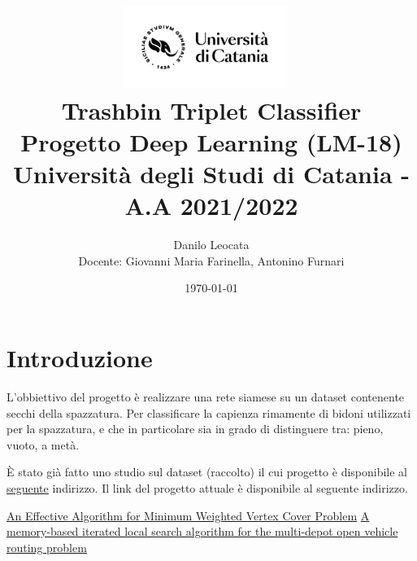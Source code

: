 \documentclass[11pt]{article}
\title{ %
\includegraphics[width=0.4\textwidth]{UniCT-Logo-Nero}~\\
Trashbin Triplet Classifier \\ 
\large Progetto Deep Learning (LM-18) \\ Università degli Studi di Catania - A.A 2021/2022 \\
}
\author{ Danilo Leocata \\ Docente: Giovanni Maria Farinella, Antonino Furnari}
\date{\today}
\begin{document}
\maketitle	
\pagebreak


\section{Introduzione}

L'obbiettivo del progetto è realizzare una rete siamese su un dataset contenente secchi della spazzatura.
Per classificare la capienza rimamente di bidoni utilizzati per la spazzatura, e che in particolare sia in grado di distinguere tra: pieno, vuoto, a metà.

È stato già fatto uno studio sul dataset (raccolto) il cui progetto è disponibile al \href{https://github.com/khalld/trashbin-classifier}{seguente} indirizzo.
Il link del progetto attuale è disponibile al seguente indirizzo.

\pagebreak

\begin{thebibliography}{5}


 \href{https://www.researchgate.net/publication/242463011_An_Effective_Algorithm_for_Minimum_Weighted_Vertex_Cover_problem}{An Effective Algorithm for Minimum Weighted Vertex Cover Problem}
 \href{https://www.sciencedirect.com/science/article/abs/pii/S0377221720300278}{A memory-based iterated local search algorithm for the multi-depot open vehicle routing problem}

\end{thebibliography}


\pagebreak
\end{document}
